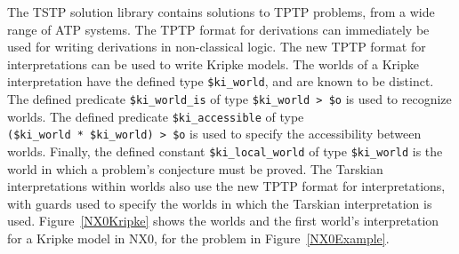 \documentclass[runningheads]{llncs}
\begin{document}
The TSTP solution library \cite{Sut07-CSR} contains solutions to TPTP problems, from a wide range
of ATP systems.
The TPTP format for derivations \cite{SS+06} can immediately be used for writing derivations in
non-classical logic.
The new TPTP format for interpretations \cite{SS+23-LPAR} can be used to write Kripke models.
The worlds of a Kripke interpretation have the defined type {\tt \$ki\_world}, and are known to 
be distinct.
The defined predicate {\tt \$ki\_world\_is} of type {\tt \$ki\_world~>~\$o} is used to recognize 
worlds.
The defined predicate {\tt \$ki\_access\-ible} of type {\tt (\$ki\_world~*~\$ki\_world)~>~\$o} is
used to specify the accessibility between worlds.
Finally, the defined constant {\tt \$ki\_local\_world} of type {\tt \$ki\_world} is the world in
which a problem's conjecture must be proved. 
The Tarskian interpretations within worlds also use the new TPTP format for interpretations,
with guards used to specify the worlds in which the Tarskian interpretation is used.
Figure~\ref{NX0Kripke} shows the worlds and the first world's interpretation for a Kripke
model in NX0, for the problem in Figure~\ref{NX0Example}.
\end{document}
